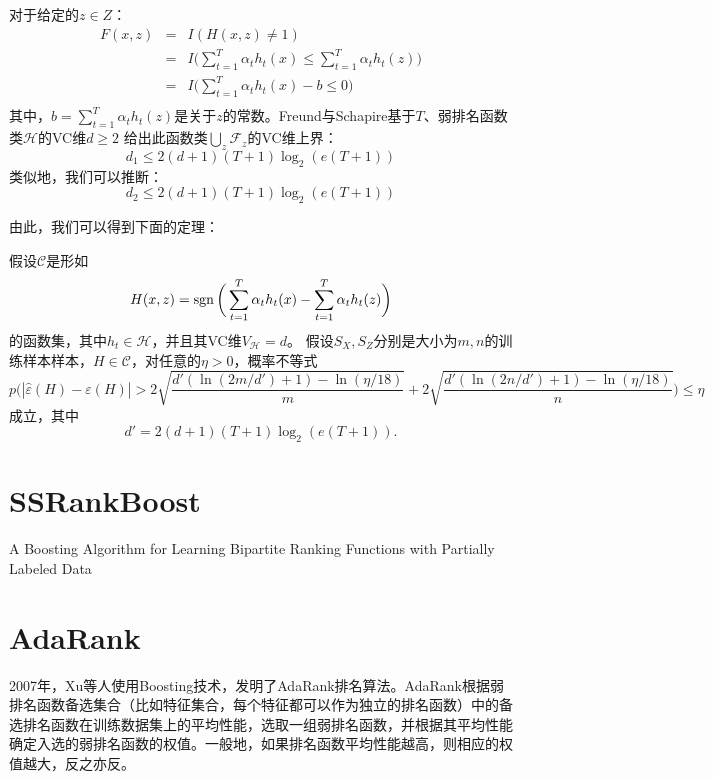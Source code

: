 对于给定的$z\in Z$：
\begin{equation}
    \begin{array}{lll}
      F(x,z) & = & I(H(x,z)\ne 1) \\
       & = & I\bigg(\sum\limits_{t=1}^T \alpha_t h_t(x) \le \sum\limits_{t=1}^T \alpha_t h_t(z)\bigg) \\
       & = & I\bigg(\sum\limits_{t=1}^T \alpha_t h_t(x) - b \le 0\bigg) \\
    \end{array}
\end{equation}
其中，$b=\sum\limits_{t=1}^T \alpha_t h_t(z)$是关于$z$的常数。Freund与Schapire\cite{freund1995desicion}基于$T$、弱排名函数类$\mathcal{H}$的VC维$d\ge 2$ 给出此函数类$\bigcup\limits_z \mathcal{F}_z$的VC维上界：
\begin{equation}
    d_1 \le 2(d+1) (T+1) \log_2(e(T+1))
\end{equation}
类似地，我们可以推断：
\begin{equation}
    d_2 \le 2(d+1) (T+1) \log_2(e(T+1))
\end{equation}

由此，我们可以得到下面的定理：
\begin{theorem}
假设$\mathcal{C}$是形如
\[
    H(x,z) = \operatorname{\mathrm{sgn}}\bigg(\sum\limits_{t=1}^T \alpha_t h_t(x) - \sum\limits_{t=1}^T \alpha_t h_t(z)\bigg)
\]
的函数集，其中$h_t\in \mathcal{H}$，并且其VC维$V_{\mathcal{H}}=d$。
假设$S_X,S_Z$分别是大小为$m,n$的训练样本样本，$H\in \mathcal{C}$，对任意的$\eta>0$，概率不等式
\begin{equation}
    p\bigg(|\hat{\varepsilon}(H) - \varepsilon(H)| >  2\sqrt{\frac{d'(\ln(2m/d') + 1) - \ln(\eta/18)}{m}} + 2\sqrt{\frac{d'(\ln(2n/d') + 1) - \ln(\eta/18)}{n}} \bigg) \le \eta
\end{equation}
成立，其中
\begin{equation}
    d' = 2(d+1) (T+1) \log_2(e(T+1)).
\end{equation}
\end{theorem}

\section{SSRankBoost}
\cite{amini2008boosting}A Boosting Algorithm for Learning Bipartite Ranking Functions with Partially Labeled Data%

\section{AdaRank}
2007年，Xu等人\cite{xu2007adarank}使用Boosting技术，发明了AdaRank排名算法。AdaRank根据弱排名函数备选集合（比如特征集合，每个特征都可以作为独立的排名函数）中的备选排名函数在训练数据集上的平均性能，选取一组弱排名函数，并根据其平均性能确定入选的弱排名函数的权值。一般地，如果排名函数平均性能越高，则相应的权值越大，反之亦反。

